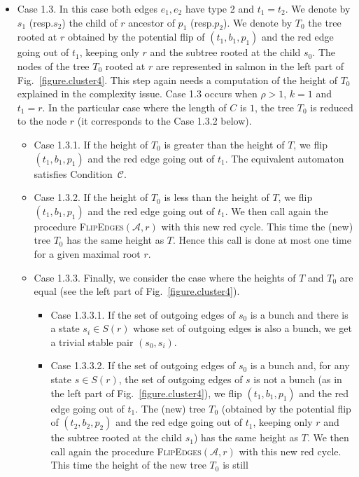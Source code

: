 \documentclass[11pt,a4paper]{article}
\def\A{\mathcal{A}}
\def\C{\mathscr{C}}
\def\T{{T}}
\newcommand{\resp}{{resp.}\xspace }
\begin{document}
\begin{itemize}
\begin{itemize}
\item Case 1.3. In this case both edges $e_1,e_2$ have type 2 and $t_1
  = t_2$.  We denote by $s_1$ (\resp $s_2$) the child of $r$ ancestor
  of $p_1$ (\resp $p_2$).  We denote by $\T_0$ the tree rooted at $r$
  obtained by the potential flip of $(t_1,b_1,p_1)$ and the red edge
  going out of $t_1$, keeping only $r$ and the subtree rooted at the
  child $s_0$. The nodes of the tree $\T_0$ rooted at $r$ are
  represented in salmon in the left part of
  Fig.~\ref{figure.cluster4}.  This step again needs a computation of
  the height of $\T_0$ explained in the complexity issue. Case 1.3
  occurs when $\rho > 1$, $k=1$ and $t_1=r$.  In the particular case
  where the length of $C$ is $1$, the tree $\T_0$ is reduced to the node
  $r$ (it corresponds to the Case 1.3.2 below).
\begin{itemize}
\item Case 1.3.1. If the height of $\T_0$ is greater than the height of $\T$,
  we flip $(t_1,b_1,p_1)$ and the red edge going out of
  $t_1$. The equivalent automaton satisfies
  Condition~$\C$. 
\item Case 1.3.2. If the height of $\T_0$ is less than the height of
  $\T$, we flip $(t_1,b_1,p_1)$ and the red edge going
  out of $t_1$. We then call again the procedure
  \textsc{FlipEdges}$(\A,r)$ with this new red cycle. This time the
  (new) tree $\T_0$ has the same height as $\T$.  Hence this
  call is done at most one time for a given maximal root $r$. 
\item Case 1.3.3. Finally, we consider the case where the heights of $\T$ and
$\T_0$ are equal (see the left part of Fig.~\ref{figure.cluster4}).
\begin{itemize}
\item Case 1.3.3.1.
If the set of outgoing edges of $s_0$ is a bunch and there is a state
$s_i \in S(r)$ whose set of outgoing edges is also a
bunch, we get a trivial stable pair $(s_0,s_i)$. 
\item Case 1.3.3.2.  If the set of outgoing edges of $s_0$ is a bunch
  and, for any state $s \in S(r)$, the set of outgoing edges of $s$ is
  not a bunch (as in the left part of Fig.~\ref{figure.cluster4}), we
  flip $(t_1,b_1,p_1)$ and the red edge going out of $t_1$. The (new)
  tree $\T_0$ (obtained by the potential flip of $(t_2,b_2,p_2)$ and
  the red edge going out of $t_1$, keeping only $r$ and the subtree
  rooted at the child $s_1$) has the same height as $\T$.  We then
  call again the procedure \textsc{FlipEdges}$(\A,r)$ with this new
  red cycle. This time the height of the new tree $\T_0$ is still

\end{itemize}
\end{itemize}
\end{itemize}
\end{itemize}
\end{document}
